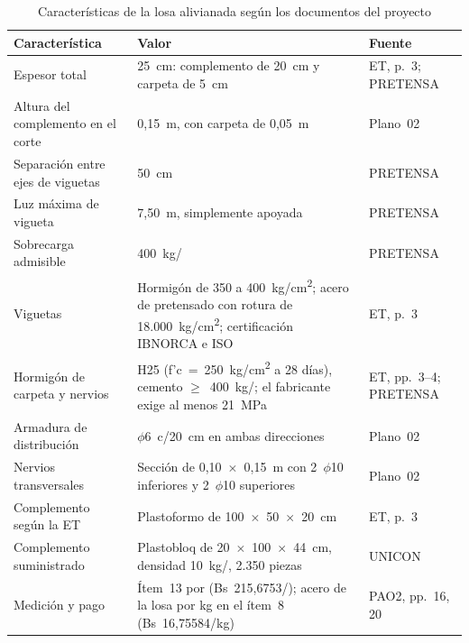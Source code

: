 \begin{table}[H]
\caption{Características de la losa alivianada según los documentos del proyecto}
\label{tab:sistema}
\setlength{\tabcolsep}{4pt}
\begin{tabularx}{\linewidth}{@{}P{4.0cm}LP{3.3cm}@{}}
\toprule
\textbf{Característica} & \textbf{Valor} & \textbf{Fuente} \\
\midrule
Espesor total & 25~cm: complemento de 20~cm y carpeta de 5~cm & ET, p.~3; PRETENSA \\
Altura del complemento en el corte & 0,15~m, con carpeta de 0,05~m & Plano~02 \\
Separación entre ejes de viguetas & 50~cm & PRETENSA \\
Luz máxima de vigueta & 7,50~m, simplemente apoyada & PRETENSA \\
Sobrecarga admisible & 400~kg/\mdos{} & PRETENSA \\
Viguetas & Hormigón de 350 a 400~kg/cm\textsuperscript{2}; acero de pretensado con rotura de 18.000~kg/cm\textsuperscript{2}; certificación IBNORCA e ISO & ET, p.~3 \\
Hormigón de carpeta y nervios & H25 (f'c~=~250~kg/cm\textsuperscript{2} a 28 días), cemento $\geq$~400~kg/\mtres{}; el fabricante exige al menos 21~MPa & ET, pp.~3--4; PRETENSA \\
Armadura de distribución & $\phi$6~c/20~cm en ambas direcciones & Plano~02 \\
Nervios transversales & Sección de 0,10~$\times$~0,15~m con 2~$\phi$10 inferiores y 2~$\phi$10 superiores & Plano~02 \\
Complemento según la ET & Plastoformo de 100~$\times$~50~$\times$~20~cm & ET, p.~3 \\
Complemento suministrado & Plastobloq de 20~$\times$~100~$\times$~44~cm, densidad 10~kg/\mtres{}, 2.350 piezas & UNICON \\
Medición y pago & Ítem~13 por \mdos{} (Bs~215,6753/\mdos{}); acero de la losa por kg en el ítem~8 (Bs~16,75584/kg) & PAO2, pp.~16, 20 \\
\bottomrule
\end{tabularx}
\end{table}

